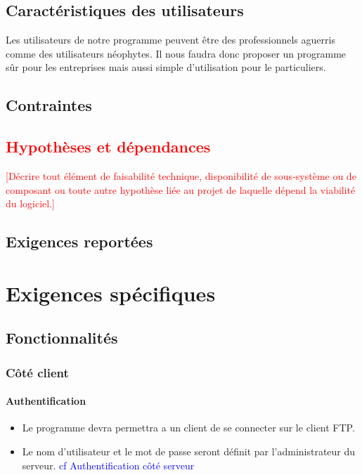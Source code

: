 \documentclass[10pt,a4paper]{report}
\begin{document}
\subsection{Caractéristiques des utilisateurs}
Les utilisateurs de notre programme peuvent être des professionnels aguerris comme des utilisateurs néophytes. Il nous faudra donc proposer un programme sûr pour les entreprises mais aussi simple d'utilisation pour le particuliers.

\subsection{Contraintes}

\textcolor{red}{\subsection{Hypothèses et dépendances}
[Décrire tout élément de faisabilité technique, disponibilité de sous-système ou de composant ou toute autre hypothèse liée au projet de laquelle dépend la viabilité du logiciel.]}

\subsection{Exigences reportées}

\section{Exigences spécifiques}

\subsection{Fonctionnalités}

\subsubsection{Côté client}
\paragraph{Authentification}
	\begin{itemize}[label = $\triangleright$]
		\item Le programme devra permettra a un client de se connecter sur le client FTP.
		\item Le nom d'utilisateur et le mot de passe seront définit par l'administrateur du serveur. \textcolor{blue}{cf Authentification côté serveur}
	\end{itemize}
\end{document}
